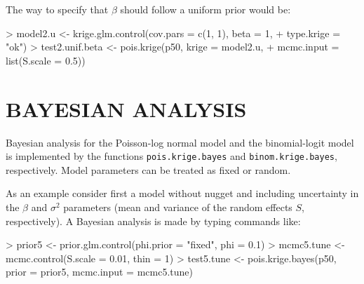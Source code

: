 \documentclass[12pt,a4paper]{article}
\newcommand{\code}[1]{\texttt{\small #1}}
\let\command=\code
\begin{document}
The way to specify that $\beta$ should follow a uniform prior would be:
\begin{Schunk}
\begin{Sinput}
> model2.u <- krige.glm.control(cov.pars = c(1, 1), beta = 1, 
+     type.krige = "ok")
> test2.unif.beta <- pois.krige(p50, krige = model2.u, 
+     mcmc.input = list(S.scale = 0.5))
\end{Sinput}
\end{Schunk}

\section{BAYESIAN ANALYSIS }

Bayesian analysis for the Poisson-log normal model and the binomial-logit model is implemented by the functions 
\command{pois.krige.bayes} and \command{binom.krige.bayes}, respectively.
Model parameters can be treated as fixed or random.        

As an example consider first a model without nugget and including uncertainty in the $\beta$ and $\sigma^2$ parameters (mean and variance of the random effects $S$, respectively). 
A Bayesian analysis is made by typing commands like: 
\begin{Schunk}
\begin{Sinput}
> prior5 <- prior.glm.control(phi.prior = "fixed", phi = 0.1)
> mcmc5.tune <- mcmc.control(S.scale = 0.01, thin = 1)
> test5.tune <- pois.krige.bayes(p50, prior = prior5, mcmc.input = mcmc5.tune)
\end{Sinput}
\end{Schunk}
\end{document}
